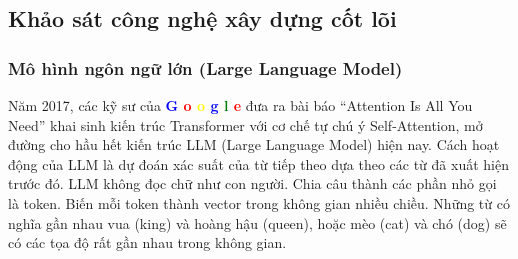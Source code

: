 \subsection{Khảo sát công nghệ xây dựng cốt lõi}

\subsubsection{Mô hình ngôn ngữ lớn (Large Language Model)}

Năm 2017, các kỹ sư của
\textbf{
\textcolor{blue}{G}%
\textcolor{red}{o}%
\textcolor{yellow}{o}%
\textcolor{blue}{g}%
\textcolor{green}{l}%
\textcolor{red}{e}
}
đưa ra bài báo \enquote{Attention Is All You Need}
khai sinh kiến trúc Transformer
với cơ chế tự chú ý Self-Attention,
mở đường cho hầu hết kiến trúc
LLM (Large Language Model) hiện nay.
Cách hoạt động của LLM
là dự đoán xác suất của từ tiếp theo
dựa theo các từ đã xuất hiện trước đó.
LLM không đọc chữ như con người.
Chia câu thành các phần nhỏ gọi là token.
Biến mỗi token thành vector
trong không gian nhiều chiều.
Những từ có nghĩa gần nhau
vua (king) và hoàng hậu (queen), hoặc mèo (cat) và chó (dog)
sẽ có các tọa độ rất gần nhau trong không gian.

